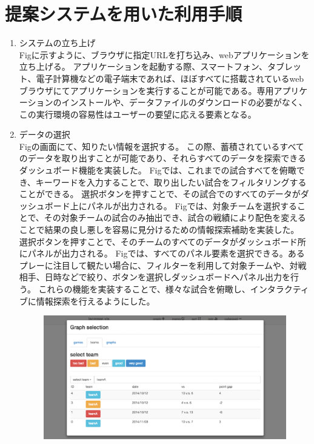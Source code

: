 \documentclass[sotsuron]{kuee}
\begin{document}
	\section{提案システムを用いた利用手順}
		\begin{enumerate}
			\item システムの立ち上げ
				\\Figに示すように、ブラウザに指定URLを打ち込み、webアプリケーションを立ち上げる。
				アプリケーションを起動する際、スマートフォン、タブレット、電子計算機などの電子端末であれば、ほぼすべてに搭載されているwebブラウザにてアプリケーションを実行することが可能である。専用アプリケーションのインストールや、データファイルのダウンロードの必要がなく、この実行環境の容易性はユーザーの要望に応える要素となる。
			\item データの選択
				\\Figの画面にて、知りたい情報を選択する。
				この際、蓄積されているすべてのデータを取り出すことが可能であり、それらすべてのデータを探索できるダッシュボード機能を実装した。
				Figでは、これまでの試合すべてを俯瞰でき、キーワードを入力することで、取り出したい試合をフィルタリングすることができる。
				選択ボタンを押すことで、その試合でのすべてのデータがダッシュボード上にパネルが出力される。
				Figでは、対象チームを選択することで、その対象チームの試合のみ抽出でき、試合の戦績により配色を変えることで結果の良し悪しを容易に見分けるための情報探索補助を実装した。
				選択ボタンを押すことで、そのチームのすべてのデータがダッシュボード所にパネルが出力される。
				Figでは、すべてのパネル要素を選択できる。あるプレーに注目して観たい場合に、フィルターを利用して対象チームや、対戦相手、日時などで絞り、ボタンを選択しダッシュボードへパネル出力を行う。
				これらの機能を実装することで、様々な試合を俯瞰し、インタラクティブに情報探索を行えるようにした。
				\begin{figure}
					\begin{center}
						\includegraphics[width=\linewidth]{selection.eps}

\end{center}
\end{figure}
\end{enumerate}
\end{document}
